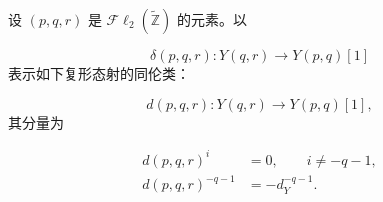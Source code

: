 设 $(p,q,r)$ 是 $\mathcal{F}\ell_2(\widetilde{\mathbb Z})$ 的元素。以

\begin{equation}
\delta(p,q,r)\colon Y(q,r)\longrightarrow Y(p,q)[1]
\tag{4.1.2.6}
\end{equation}
表示如下复形态射的同伦类：

\begin{equation}
d(p,q,r)\colon Y(q,r)\longrightarrow Y(p,q)[1],
\tag{4.1.2.7}
\end{equation}
其分量为

\begin{equation}
\begin{aligned}
d(p,q,r)^i&=0,\qquad i\neq-q-1,\\
d(p,q,r)^{-q-1}&=-d_Y^{-q-1}.
\end{aligned}
\tag{4.1.2.8}
\end{equation}
\endgroup
